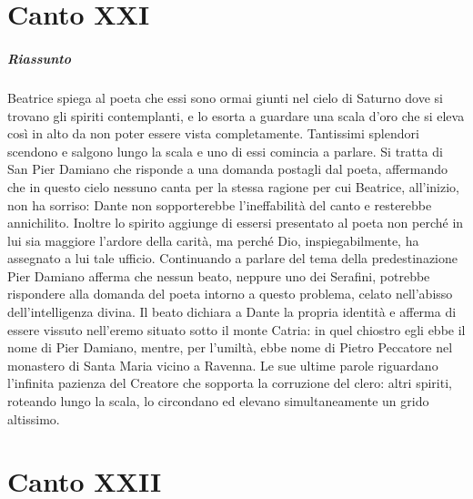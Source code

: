 \documentclass[a4paper, twoside, titlepage]{book}
\begin{document}
\chapter{Canto XXI}

\paragraph{Riassunto} Beatrice spiega al poeta che essi sono ormai giunti nel cielo di Saturno dove si trovano gli spiriti contemplanti, e lo esorta a guardare una scala d’oro che si eleva così in alto da non poter essere vista completamente. Tantissimi splendori scendono e salgono lungo la scala e uno di essi comincia a parlare. Si tratta di San Pier Damiano che risponde a una domanda postagli dal poeta, affermando che in questo cielo nessuno canta per la stessa ragione per cui Beatrice, all’inizio, non ha sorriso: Dante non sopporterebbe l’ineffabilità del canto e resterebbe annichilito. Inoltre lo spirito aggiunge di essersi presentato al poeta non perché in lui sia maggiore l’ardore della carità, ma perché Dio, inspiegabilmente, ha assegnato a lui tale ufficio. Continuando a parlare del tema della predestinazione Pier Damiano afferma che nessun beato, neppure uno dei Serafini, potrebbe rispondere alla domanda del poeta intorno a questo problema, celato nell’abisso dell’intelligenza divina. Il beato dichiara a Dante la propria identità e afferma di essere vissuto nell’eremo situato sotto il monte Catria: in quel chiostro egli ebbe il nome di Pier Damiano, mentre, per l’umiltà, ebbe nome di Pietro Peccatore nel monastero di Santa Maria vicino a Ravenna. Le sue ultime parole riguardano l’infinita pazienza del Creatore che sopporta la corruzione del clero: altri spiriti, roteando lungo la scala, lo circondano ed elevano simultaneamente un grido altissimo.

\chapter{Canto XXII}
\end{document}
